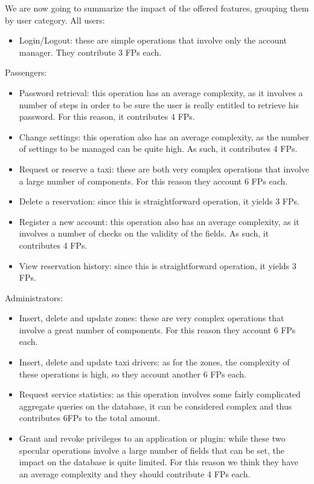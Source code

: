 We are now going to summarize the impact of the offered features, grouping them by user category.  
All users:
\begin{itemize}
	\item Login/Logout: these are simple operations that involve only the account manager. They contribute 3 FPs each.
\end{itemize}
Passengers:
\begin{itemize}
	\item Password retrieval: this operation has an average complexity, as it involves a number of steps in order to be sure the user is really entitled to retrieve his password. For this reason, it contributes 4 FPs.
	\item Change settings: this operation also has an average complexity, as the number of settings to be managed can be quite high. As such, it contributes 4 FPs.
	\item Request or reserve a taxi: these are both very complex operations that involve a large number of components. For this reason they account 6 FPs each.
	\item Delete a reservation: since this is straightforward operation, it yields 3 FPs. 
	\item Register a new account: this operation also has an average complexity, as it involves a number of checks on the validity of the fields. As such, it contributes 4 FPs.
	\item View reservation history: since this is straightforward operation, it yields 3 FPs. 
\end{itemize}
Administrators:
\begin{itemize}
	\item Insert, delete and update zones: these are very complex operations that involve a great number of components. For this reason they account 6 FPs each.
	\item Insert, delete and update taxi drivers: as for the zones, the complexity of these operations is high, so they account another 6 FPs each. 
	\item Request service statistics: as this operation involves some fairly complicated aggregate queries on the database, it can be considered complex and thus contributes 6FPs to the total amount.
	\item Grant and revoke privileges to an application or plugin: while these two specular operations involve a large number of fields that can be set, the impact on the database is quite limited. For this reason we think they have an average complexity and they should contribute 4 FPs each.
\end{itemize}
